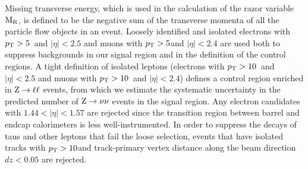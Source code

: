 Missing transverse energy, which is used in the calculation of the razor variable $\mathrm{M_R}$, is 
defined to be the negative sum of the transverse momenta of all the particle flow objects in an
event.  Loosely identified and isolated electrons with $p_{\mathrm{T}} > 5$~\GeV and $|\eta| < 2.5$ and muons
with $p_{\mathrm{T}} > 5$\GeV and $|\eta| < 2.4$ are used both to suppress backgrounds in our signal region and
in the definition of the control regions.  A tight definition of isolated leptons (electrons with
$p_{\mathrm{T}} > 10$~\GeV and $|\eta| < 2.5$ and muons with $p_{\mathrm{T}} > 10$~\GeV and $|\eta| < 2.4$) defines a
control region enriched in $\mathrm{Z} \rightarrow \ell \ell $ events, from which we estimate the
systematic uncertainty in the predicted number of $\mathrm{Z} \rightarrow \nu \nu$ events in the signal
region. Any electron candidates with $1.44 < |\eta| < 1.57$ are rejected since the transition region
between barrel and endcap calorimeters is less well-instrumented.
In order to suppress the decays of taus and other leptons that fail the loose selection, events that
have isolated tracks with $p_{\mathrm{T}} > 10$\GeV and track-primary vertex distance along the beam direction
$dz < 0.05$ are rejected.


